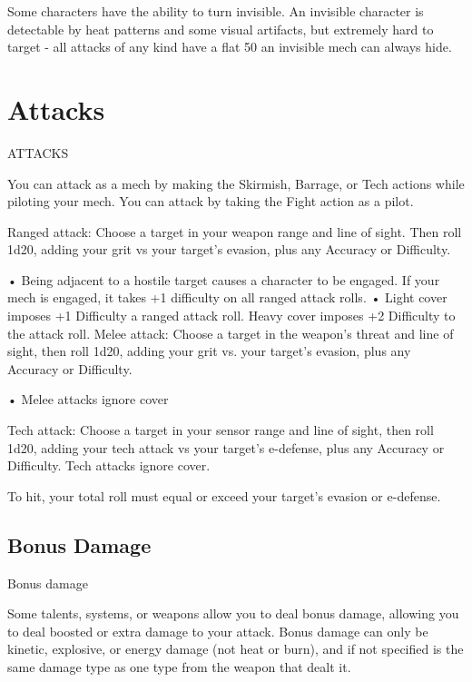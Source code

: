 Some characters have the ability to turn invisible. An invisible character is detectable by heat
patterns and some visual artifacts, but extremely hard to target - all attacks of any kind have a
flat 50%
an invisible mech can always hide.
\section{Attacks}
                                                  ATTACKS

You can attack as a mech by making the Skirmish, Barrage, or Tech actions while piloting your
mech. You can attack by taking the Fight action as a pilot.

Ranged attack: Choose a target in your weapon range and line of sight. Then roll 1d20, adding
your grit vs your target’s evasion, plus any Accuracy or Difficulty.

                      •  Being adjacent to a hostile target causes a character to be engaged. If your
                        mech is engaged, it takes +1 difficulty on all ranged attack rolls.
                      •  Light cover imposes +1 Difficulty a ranged attack roll. Heavy cover imposes
                        +2 Difficulty to the attack roll.
Melee attack: Choose a target in the weapon’s threat and line of sight, then roll 1d20, adding
your grit vs. your target’s evasion, plus any Accuracy or Difficulty.

                      •  Melee attacks ignore cover

Tech attack: Choose a target in your sensor range and line of sight, then roll 1d20, adding your
tech attack vs your target’s e-defense, plus any Accuracy or Difficulty. Tech attacks ignore
cover.


To hit, your total roll must equal or exceed your target’s evasion or e-defense.

\subsection{Bonus Damage}
                                             Bonus damage

Some talents, systems, or weapons allow you to deal bonus damage, allowing you to deal
boosted or extra damage to your attack. Bonus damage can only be kinetic, explosive, or energy
damage (not heat or burn), and if not specified is the same damage type as one type from the
weapon that dealt it.


